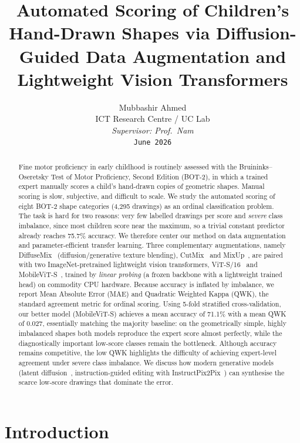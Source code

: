 \documentclass[10pt,twocolumn,letterpaper]{article}
\title{\textbf{Automated Scoring of Children's Hand-Drawn Shapes via
  Diffusion-Guided Data Augmentation and Lightweight Vision Transformers}}
\author{%
  Mubbashir Ahmed\\
  ICT Research Centre / UC Lab\\
  \textit{Supervisor: Prof.\ Nam}\\
  \texttt{June 2026}
}
\newcommand{\BaselineMeanAcc}{75.7}
\newcommand{\BestModel}{MobileViT-S}
\newcommand{\BestMeanAcc}{71.1}
\newcommand{\BestMeanQWK}{0.027}
\begin{document}
\maketitle

\begin{abstract}
Fine motor proficiency in early childhood is routinely assessed with the
Bruininks--Oseretsky Test of Motor Proficiency, Second Edition (BOT-2), in
which a trained expert manually scores a child's hand-drawn copies of
geometric shapes. Manual scoring is slow, subjective, and difficult to
scale. We study the automated scoring of eight BOT-2 shape categories
(4{,}295 drawings) as an ordinal classification problem. The task is hard for
two reasons: very few labelled drawings per score and \emph{severe} class
imbalance, since most children score near the maximum, so a trivial constant
predictor already reaches \BaselineMeanAcc\% accuracy. We therefore center our
method on data augmentation and parameter-efficient transfer learning. Three
complementary augmentations, namely DiffuseMix~\cite{diffusemix}
(diffusion/generative texture blending), CutMix~\cite{cutmix} and
MixUp~\cite{mixup}, are paired with two ImageNet-pretrained lightweight vision
transformers, ViT-S/16~\cite{vit} and MobileViT-S~\cite{mobilevit}, trained by
\emph{linear probing} (a frozen backbone with a lightweight trained head) on
commodity CPU hardware. Because accuracy is inflated by imbalance, we report
Mean Absolute Error (MAE) and Quadratic Weighted Kappa (QWK), the standard
agreement metric for ordinal scoring. Using 5-fold stratified cross-validation,
our better model (\BestModel) achieves a mean accuracy of \BestMeanAcc\% with a
mean QWK of \BestMeanQWK, essentially matching the majority baseline: on the
geometrically simple, highly imbalanced shapes both models reproduce the
expert score almost perfectly, while the diagnostically important low-score
classes remain the bottleneck. Although accuracy remains competitive, the low
QWK highlights the difficulty of achieving expert-level agreement under severe
class imbalance. We discuss how modern generative models (latent
diffusion~\cite{stablediffusion}, instruction-guided editing with
InstructPix2Pix~\cite{ip2p}) can synthesise the scarce low-score drawings that
dominate the error.
\end{abstract}

\section{Introduction}
\label{sec:intro}
\end{document}
